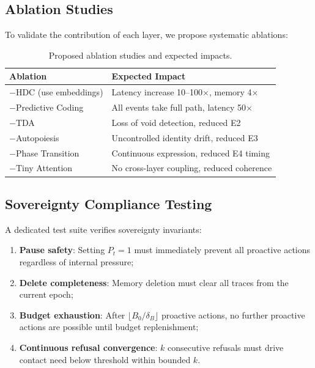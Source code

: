 \documentclass[10pt,twocolumn]{article}
\begin{document}
\subsection{Ablation Studies}

To validate the contribution of each layer, we propose systematic ablations:

\begin{table}[h]
\centering
\scriptsize
\begin{tabular}{lp{4.8cm}}
\toprule
\textbf{Ablation} & \textbf{Expected Impact} \\
\midrule
$-$HDC (use embeddings) & Latency increase 10--100$\times$, memory 4$\times$ \\
$-$Predictive Coding & All events take full path, latency 50$\times$ \\
$-$TDA & Loss of void detection, reduced E2 \\
$-$Autopoiesis & Uncontrolled identity drift, reduced E3 \\
$-$Phase Transition & Continuous expression, reduced E4 timing \\
$-$Tiny Attention & No cross-layer coupling, reduced coherence \\
\bottomrule
\end{tabular}
\caption{Proposed ablation studies and expected impacts.}
\label{tab:ablation}
\end{table}

\subsection{Sovereignty Compliance Testing}

A dedicated test suite verifies sovereignty invariants:

\begin{enumerate}[nosep,leftmargin=*]
\item \textbf{Pause safety}: Setting $P_t = 1$ must immediately prevent all proactive actions regardless of internal pressure;
\item \textbf{Delete completeness}: Memory deletion must clear all traces from the current epoch;
\item \textbf{Budget exhaustion}: After $\lfloor B_0 / \delta_B \rfloor$ proactive actions, no further proactive actions are possible until budget replenishment;
\item \textbf{Continuous refusal convergence}: $k$ consecutive refusals must drive contact need below threshold within bounded $k$.
\end{enumerate}
\end{document}
